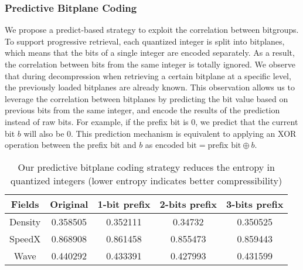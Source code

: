 \subsubsection{Predictive Bitplane Coding}

We propose a predict-based strategy to exploit the correlation between bitgroups. To support progressive retrieval, each quantized integer is split into bitplanes, which means that the bits of a single integer are encoded separately. As a result, the correlation between bits from the same integer is totally ignored. 
We observe that during decompression when retrieving a certain bitplane at a specific level, the previously loaded bitplanes are already known. This observation allows us to leverage the correlation between bitplanes by predicting the bit value based on previous bits from the same integer, and encode the results of the prediction instead of raw bits. For example, if the prefix bit is 0, we predict that the current bit $b$ will also be 0. This prediction mechanism is equivalent to applying an XOR operation between the prefix bit and $b$ as $\text{encoded bit} = \text{prefix bit} \oplus b $.

\begin{table}[ht]
\centering
\footnotesize
  \caption{Our predictive bitplane coding strategy reduces the entropy in quantized integers (lower entropy indicates better compressibility)} 
  \vspace{-2mm}
  \label{tb:entropy} 
  \begin{adjustbox}{width=\columnwidth}
    \begin{tabular}{|c|c|c|c|c|}
        \hline
        Fields & Original & 1-bit prefix & 2-bits prefix & 3-bits prefix  \\ 
        \hline
        Density    & 0.358505 & 0.352111 & 0.34732 & 0.350525   \\
        SpeedX    & 0.868908 & 0.861458 & 0.855473 & 0.859443     \\
        Wave    & 0.440292 & 0.433391 & 0.427993 & 0.431599   \\
        \hline
    \end{tabular} 
\end{adjustbox}
\end{table}


